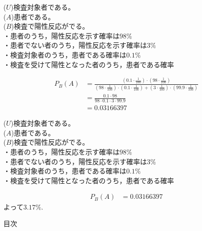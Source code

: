 \documentclass[aspectratio=169, dvipdfmx, 11pt]{beamer}
\begin{document}
\begin{frame}
($U$)検査対象者である。\\
($A$)患者である。\\
($B$)検査で陽性反応がでる。\\

・患者のうち，陽性反応を示す確率は$98\%$\\
・患者でない者のうち，陽性反応を示す確率は$3\%$\\
・検査対象者のうち，患者である確率は$0.1\%$\\
・検査を受けて陽性となった者のうち，患者である確率

\begin{align}
P_B(A)&=\frac{(0.1\cdot \frac{1}{100})\cdot (98\cdot \frac{1}{100})}{(98\cdot \frac{1}{100})\cdot(0.1\cdot \frac{1}{100})+(3\cdot \frac{1}{100})\cdot (99.9\cdot \frac{1}{100})}\\
&=\frac{0.1\cdot 98}{98\cdot 0.1\cdot 3\cdot 99.9}\\
&=0.03166397
\end{align}

\end{frame}


\begin{frame}
($U$)検査対象者である。\\
($A$)患者である。\\
($B$)検査で陽性反応がでる。\\

・患者のうち，陽性反応を示す確率は$98\%$\\
・患者でない者のうち，陽性反応を示す確率は$3\%$\\
・検査対象者のうち，患者である確率は$0.1\%$\\
・検査を受けて陽性となった者のうち，患者である確率

\begin{align}
P_B(A)&=0.03166397
\end{align}
よって$3.17\%$.
\end{frame}


\begin{frame}{目次}
    \tableofcontents
\end{frame}

\end{document}
